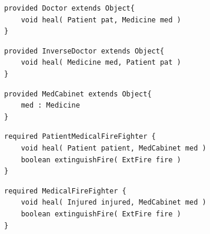 \documentclass[a4paper,12pt]{article}
\begin{document}
\begin{lstlisting}[style = dsl]
provided Doctor extends Object{	
	void heal( Patient pat, Medicine med )
}
\end{lstlisting}


\begin{lstlisting}[style = dsl]
provided InverseDoctor extends Object{	
	void heal( Medicine med, Patient pat )
}
\end{lstlisting}

\begin{lstlisting}[style = dsl]
provided MedCabinet extends Object{
	med : Medicine
}
\end{lstlisting}

\begin{lstlisting}[style = dsl]
required PatientMedicalFireFighter {
	void heal( Patient patient, MedCabinet med )
	boolean extinguishFire( ExtFire fire )	
}
\end{lstlisting}

\begin{lstlisting}[caption={Bibliothek \emph{ExampLe} von Typen},captionpos=b, style = dsl]
required MedicalFireFighter {
	void heal( Injured injured, MedCabinet med )
	boolean extinguishFire( ExtFire fire )	
}
\end{lstlisting}\label{lst:libEx}

\newpage
\end{document}
